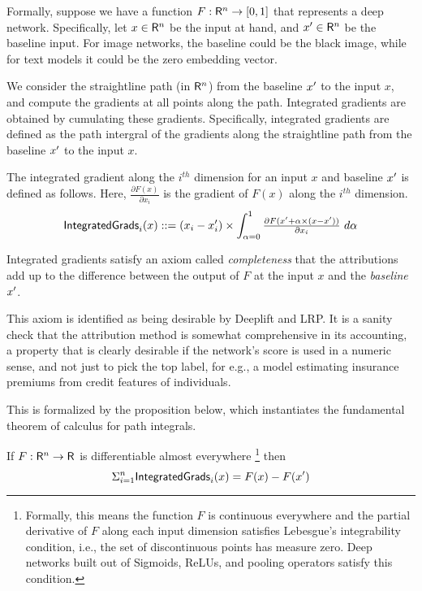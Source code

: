 Formally, suppose we have a
function $F: \mathsf{R}^n \rightarrow [0,1]$ that represents a deep network.
Specifically, let $x \in \mathsf{R}^n$ be the input at hand, and
$x' \in \mathsf{R}^n$ be the baseline input. For image networks, the baseline
could be the black image, while for text models it could be the zero
embedding vector.

We consider the straightline path (in $\mathsf{R}^n$) from the baseline $x'$ to the input
$x$, and compute the gradients at all points along the path. Integrated gradients
are obtained by cumulating these gradients. Specifically, integrated gradients
are defined as the path intergral of the gradients along the straightline
path from the baseline $x'$ to the input $x$.

The integrated gradient along the $i^{th}$ dimension for an input $x$ and baseline
$x'$ is defined as follows. Here,
$\tfrac{\partial F(x)}{\partial x_i}$ is the gradient of
$F(x)$ along the $i^{th}$ dimension.
\begin{equation}
\small
\integratedgrads_i(x) \synteq (x_i-\xbase_i)\times\int_{\sparam=0}^{1} \tfrac{\partial F(\xbase + \sparam\times(x-\xbase))}{\partial x_i  }~d\sparam
\end{equation}
 
Integrated gradients satisfy an axiom called \emph{completeness}
that the attributions add
up to the difference between the output of $F$ at the input
$x$ and the \emph{baseline}
$x'$. 

This axiom is identified as being desirable by Deeplift and LRP.
It is a sanity check that the attribution method is somewhat comprehensive
in its accounting, a property that is clearly desirable if the network’s score is
used in a numeric sense, and not just to pick the top label, for e.g.,
a model estimating insurance premiums from credit features of individuals.

This is formalized by the proposition below, which
instantiates the fundamental theorem of calculus for path
integrals.
\begin{proposition}\label{prop:additivity}
  If $F: \mathsf{R}^n \rightarrow \mathsf{R}$ is differentiable almost
  everywhere
  \footnote{Formally, this means the function $F$ is continuous everywhere
    and the partial derivative of $F$ along each input dimension satisfies
    Lebesgue's integrability condition, i.e., the set of discontinuous points
    has measure zero. Deep networks built out of Sigmoids, ReLUs, and pooling
    operators satisfy this condition.} then
  $$\Sigma_{i=1}^{n} \mathsf{IntegratedGrads}_i(x) = F(x) -
  F(x')$$
\end{proposition}

